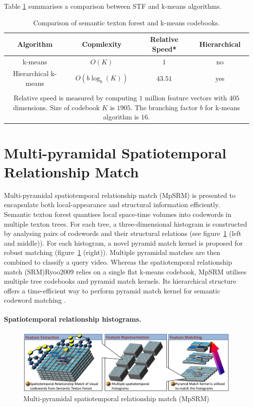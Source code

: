 Table \ref{tab/act/codebook} summarises a comparison between STF and k-means algorithms.
\begin{table}
\begin{center}
{\footnotesize
\begin{tabular}{|c|c|c|c|}
\hline
\textbf{ Algorithm} & \textbf{ Copmlexity} & \textbf{ Relative Speed}* & \textbf{ Hierarchical} \\
\hline
\hline
k-means & $O(K)$ & $1$ & no \\
Hierarchical k-means & $O(b\log_{b}(K))$ & $43.51$ & yes \\
{\color{blue}{STF}} & {\color{blue}{ $ O(\log_{2}(K)) $ }} & {\color{blue}{$559.86$}} & {\color{blue}{yes}}\\
\hline
\multicolumn{4}{p{0.75\linewidth}}{\scriptsize Relative speed is measured by computing $1$ million feature vectors with $405$ dimensions. Size of codebook $K$ is $1905$. The branching factor $b$ for k-means algorithm is $16$.}
\end{tabular}
}
\end{center}
\caption{Comparison of semantic texton forest and k-means codebooks.}
\label{tab/act/codebook}
\end{table}

\section{Multi-pyramidal Spatiotemporal Relationship Match}
\label{sec/act/MpSRM}
Multi-pyramidal spatiotemporal relationship match (MpSRM) is presented to encapsulate both local-appearance and structural information efficiently. Semantic texton forest quantises local space-time volumes into codewords in multiple texton trees. For each tree, a three-dimensional histogram is constructed by analysing pairs of codewords and their structural relations (see figure~\ref{fig/act/mpsrm} (left and middle)). For each histogram, a novel pyramid match kernel is proposed for robust matching (figure~\ref{fig/act/mpsrm} (right)). Multiple pyramidal matches are then combined to classify a query video. Whereas the spatiotemporal relationship match (SRM){Ryoo2009} relies on a single flat k-means codebook, MpSRM utilises multiple tree codebooks and pyramid match kernels. Its hierarchical structure offers a time-efficient way to perform pyramid match kernel for semantic codeword matching \cite{Grauman2005}.
\paragraph{Spatiotemporal relationship histograms.}
\begin{figure}
\includegraphics[width=1\linewidth]{fig/act/fig4.pdf}%
\caption{Multi-pyramidal spatiotemporal relationship match (MpSRM)}
\label{fig/act/mpsrm}
\end{figure}


